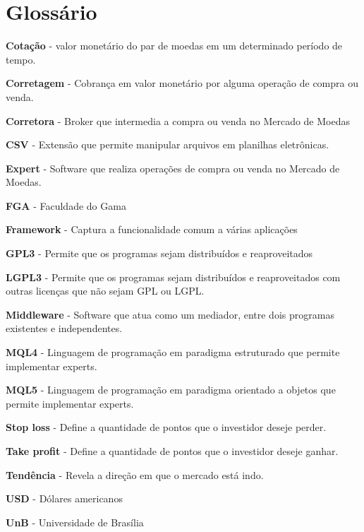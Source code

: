 \chapter{Glossário}

\textbf{Cotação} - valor monetário do par de moedas em um determinado período de tempo.

\textbf{Corretagem} - Cobrança em valor monetário por alguma operação de compra ou venda.

\textbf{Corretora} - Broker que intermedia a compra ou venda no Mercado de Moedas

\textbf{CSV} - Extensão que permite manipular arquivos em planilhas eletrônicas.

\textbf{Expert} - Software que realiza operações de compra ou venda no Mercado de Moedas.

\textbf{FGA} - Faculdade do Gama

\textbf{Framework} - Captura a funcionalidade comum a várias aplicações

\textbf{GPL3} - Permite que os programas sejam distribuídos e reaproveitados

\textbf{LGPL3} -  Permite que os programas sejam distribuídos e reaproveitados com outras licenças que não sejam GPL ou LGPL.

\textbf{Middleware} - Software que atua como um mediador, entre dois programas existentes e independentes.

\textbf{MQL4} - Linguagem de programação em paradigma estruturado que permite implementar experts.

\textbf{MQL5 }- Linguagem de programação em paradigma orientado a objetos que permite implementar experts.

\textbf{Stop loss} - Define a quantidade de pontos que o investidor deseje perder.

\textbf{Take profit} - Define a quantidade de pontos que o investidor deseje ganhar.

\textbf{Tendência} - Revela a direção em que o mercado está indo.

\textbf{USD} - Dólares americanos

\textbf{UnB} - Universidade de Brasília
